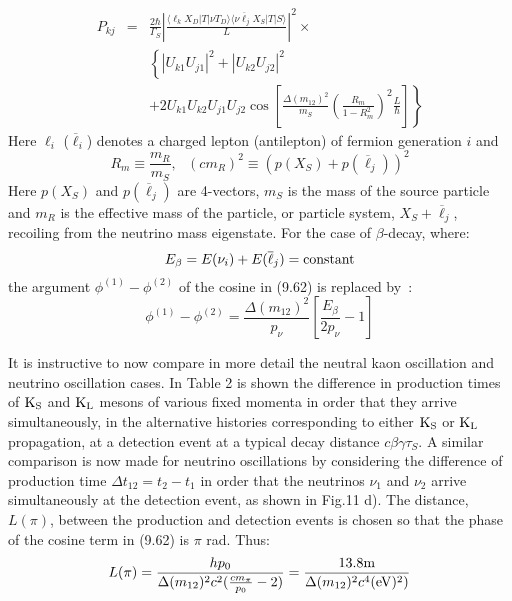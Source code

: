 {\begin{eqnarray}
       P_{k j} & = & \frac{2 \hbar}{\Gamma_{S}}\left|\frac{\langle \ell_k X_D|T|\nu T_D \rangle
        \langle \nu  \overline{\ell}_j X_S|T|S \rangle}{L}\right|^2 \times \nonumber \\   
  &  &  \left\{ |U_{k 1} U_{j 1}|^2+|U_{k 2} U_{j 2}|^2 \right. \nonumber \\ 
  &  &   \left.  +2 U_{k 1}U_{k 2}U_{j 1} U_{j 2}\cos\left[\frac{\Delta(m_{12})^2}{m_S}\left(\frac{R_m}{1-R_m^2}\right)^2
     \frac{L}{\hbar} \right] \right\}   
     \end{eqnarray}
      Here $\ell_i$ ($\overline{\ell}_i$) denotes a charged lepton (antilepton) of fermion generation
     $i$ and 
  \[ R_m \equiv \frac{m_R}{m_S},~~~ (cm_R)^2 \equiv (p(X_S) + p(\overline{\ell}_j))^2 \] 
   Here $p(X_S)$ and $p(\overline{\ell}_j)$ are 4-vectors, $m_S$ is the mass of the source
   particle and $m_R$ is the effective mass of the particle, or particle system, $ X_S+ \overline{\ell}_j$, recoiling
   from the neutrino mass eigenstate. For the case of $\beta$-decay, where:
  \[ E_{\beta} = E(\nu_i) + E(\overline{\ell}_j) = {\rm constant} \]
   the argument $\phi^{(1)}-\phi^{(2)}$ of the cosine in (9.62) is replaced by~\cite{JHF1,JHF2}:
  \begin{equation} 
 \phi^{(1)}-\phi^{(2)} = \frac{\Delta(m_{12})^2}{p_{\nu}}\left[\frac{E_{\beta}}{2p_{\nu}}-1\right]
   \end{equation}
   \par It is instructive to now compare in more detail the neutral kaon oscillation and neutrino 
   oscillation cases. In Table 2 is shown the difference in production times of ${\rm K_S}$ and ${\rm K_L}$ mesons
   of various fixed momenta in order that they arrive simultaneously, in the alternative
    histories corresponding to either ${\rm K_S}$ or ${\rm K_L}$ propagation,  at a detection event at a typical
   decay distance $c \beta \gamma \tau_S$. A similar comparison is now made for neutrino oscillations
   by considering the difference of production time $\Delta t_{12} = t_2-t_1$ in order that the neutrinos
   $\nu_1$ and $\nu_2$ arrive simultaneously at the detection event, as shown in Fig.11 d). 
   The distance, $L(\pi)$, between the production and detection events is chosen so that the 
  phase of the cosine term in (9.62) is $\pi$ rad. Thus:
    \begin{equation}
      L(\pi)  = \frac{h p_0}{\Delta(m_{12})^2 c^2 (\frac{c m_{\pi}}{p_0}-2)} =
      \frac{13.8 \rm{m}}{\Delta(m_{12})^2 c^4 ({\rm eV})^2)}
    \end{equation}
}
